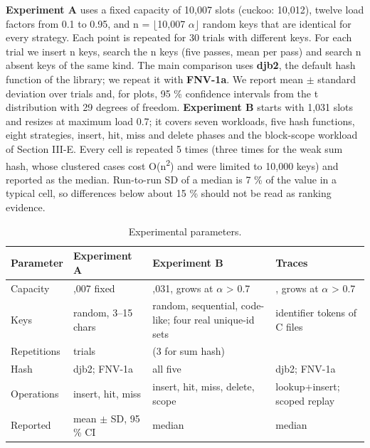 \documentclass{ieeeaccess}
\begin{document}
\textbf{Experiment A} uses a fixed capacity of 10,007 slots (cuckoo: 10,012), twelve load factors from 0.1 to 0.95, and n = $\lfloor$10,007 $\alpha$$\rfloor$ random keys that are identical for every strategy. Each point is repeated for 30 trials with different keys. For each trial we insert n keys, search the n keys (five passes, mean per pass) and search n absent keys of the same kind. The main comparison uses \textbf{djb2}, the default hash function of the library; we repeat it with \textbf{FNV-1a}. We report mean $\pm$ standard deviation over trials and, for plots, 95 \% confidence intervals from the t distribution with 29 degrees of freedom. \textbf{Experiment B} starts with 1,031 slots and resizes at maximum load 0.7; it covers seven workloads, five hash functions, eight strategies, insert, hit, miss and delete phases and the block-scope workload of Section III-E. Every cell is repeated 5 times (three times for the weak sum hash, whose clustered cases cost O(n\textsuperscript{2}) and were limited to 10,000 keys) and reported as the median. Run-to-run SD of a median is 7 \% of the value in a typical cell, so differences below about 15 \% should not be read as ranking evidence.

\begin{table}[!t]
\caption{Experimental parameters.}
\label{tab:7}
\centering
\scriptsize
\setlength{\tabcolsep}{3pt}
\begin{tabular}{|>{\raggedright\arraybackslash}p{}|>{\raggedright\arraybackslash}p{}|>{\raggedright\arraybackslash}p{}|>{\raggedright\arraybackslash}p{}|}
\hline
\textbf{Parameter} & \textbf{Experiment A} & \textbf{Experiment B} & \textbf{Traces} \\
\hline
Capacity & 10,007 fixed & 1,031, grows at $\alpha$ > 0.7 & 211, grows at $\alpha$ > 0.7 \\
Keys & random, 3--15 chars & random, sequential, code-like; four real unique-id sets & identifier tokens of C files \\
Repetitions & 30 trials & 5 (3 for sum hash) & 3 \\
Hash & djb2; FNV-1a & all five & djb2; FNV-1a \\
Operations & insert, hit, miss & insert, hit, miss, delete, scope & lookup+insert; scoped replay \\
Reported & mean $\pm$ SD, 95 \% CI & median & median \\
\hline
\end{tabular}
\end{table}
\end{document}
